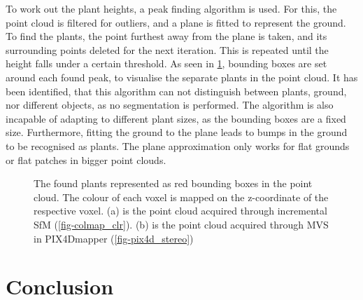 \documentclass[conference,]{IEEEtran}
\begin{document}
To work out the plant heights, a peak finding algorithm is used. For
this, the point cloud is filtered for outliers, and a plane is fitted to
represent the ground. To find the plants, the point furthest away from
the plane is taken, and its surrounding points deleted for the next
iteration. This is repeated until the height falls under a certain
threshold. As seen in \cref{fig-plants}, bounding boxes are set around
each found peak, to visualise the separate plants in the point cloud. It
has been identified, that this algorithm can not distinguish between
plants, ground, nor different objects, as no segmentation is performed.
The algorithm is also incapable of adapting to different plant sizes, as
the bounding boxes are a fixed size. Furthermore, fitting the ground to
the plane leads to bumps in the ground to be recognised as plants. The
plane approximation only works for flat grounds or flat patches in
bigger point clouds.

\begin{figure}[tp]
    \centering
    \hfil
    \caption{The found plants represented as red bounding boxes in the point cloud. The colour of each voxel is mapped on the z-coordinate of the respective voxel. (a) is the point cloud acquired through incremental SfM (\cref{fig-colmap_clr}). (b) is the point cloud acquired through MVS in PIX4Dmapper (\cref{fig-pix4d_stereo})}
    \label{fig-plants}
\end{figure}

\hypertarget{conclusion}{%
\section{Conclusion}\label{conclusion}}
\end{document}
